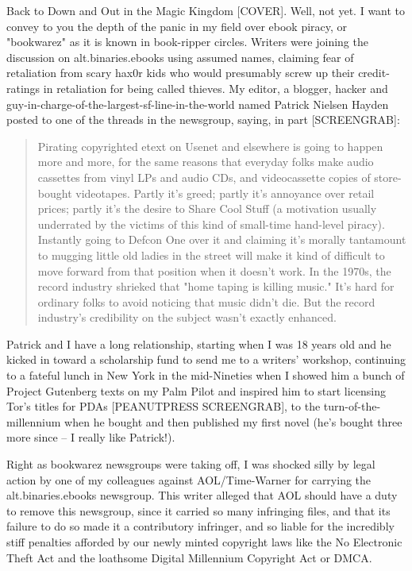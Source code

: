 Back to Down and Out in the Magic Kingdom [COVER]. Well, not yet. I
want to convey to you the depth of the panic in my field over ebook
piracy, or "bookwarez" as it is known in book-ripper circles.
Writers were joining the discussion on alt.binaries.ebooks using
assumed names, claiming fear of retaliation from scary hax0r kids
who would presumably screw up their credit-ratings in retaliation
for being called thieves. My editor, a blogger, hacker and
guy-in-charge-of-the-largest-sf-line-in-the-world named Patrick
Nielsen Hayden posted to one of the threads in the newsgroup,
saying, in part [SCREENGRAB]:

\begin{quote}
Pirating copyrighted etext on Usenet and elsewhere is going to
happen more and more, for the same reasons that everyday folks make
audio cassettes from vinyl LPs and audio CDs, and videocassette
copies of store-bought videotapes. Partly it's greed; partly it's
annoyance over retail prices; partly it's the desire to Share Cool
Stuff (a motivation usually underrated by the victims of this kind
of small-time hand-level piracy). Instantly going to Defcon One
over it and claiming it's morally tantamount to mugging little old
ladies in the street will make it kind of difficult to move forward
from that position when it doesn't work. In the 1970s, the record
industry shrieked that "home taping is killing music." It's hard
for ordinary folks to avoid noticing that music didn't die. But the
record industry's credibility on the subject wasn't exactly
enhanced.

\end{quote}
Patrick and I have a long relationship, starting when I was 18
years old and he kicked in toward a scholarship fund to send me to
a writers' workshop, continuing to a fateful lunch in New York in
the mid-Nineties when I showed him a bunch of Project Gutenberg
texts on my Palm Pilot and inspired him to start licensing Tor's
titles for PDAs [PEANUTPRESS SCREENGRAB], to the
turn-of-the-millennium when he bought and then published my first
novel (he's bought three more since -- I really like Patrick!).

Right as bookwarez newsgroups were taking off, I was shocked silly
by legal action by one of my colleagues against AOL/Time-Warner for
carrying the alt.binaries.ebooks newsgroup. This writer alleged
that AOL should have a duty to remove this newsgroup, since it
carried so many infringing files, and that its failure to do so
made it a contributory infringer, and so liable for the incredibly
stiff penalties afforded by our newly minted copyright laws like
the No Electronic Theft Act and the loathsome Digital Millennium
Copyright Act or DMCA.

